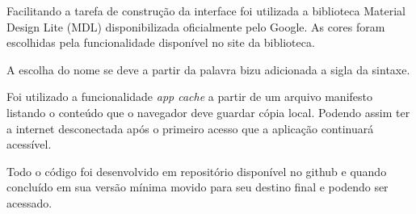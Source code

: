Facilitando a tarefa de construção da interface foi utilizada a biblioteca Material Design Lite (MDL)\nocite{mdl} disponibilizada oficialmente pelo Google. As cores foram escolhidas pela funcionalidade disponível no site da biblioteca.

A escolha do nome se deve a partir da palavra bizu adicionada a sigla da sintaxe.

Foi utilizado a funcionalidade \textit{app cache} a partir de um arquivo manifesto listando o conteúdo que o navegador deve guardar cópia local. Podendo assim ter a internet desconectada após o primeiro acesso que a aplicação continuará acessível.

Todo o código foi desenvolvido em repositório disponível no github e quando concluído em sua versão mínima movido para seu destino final e podendo ser acessado.\nocite{bizual}\color{black}

